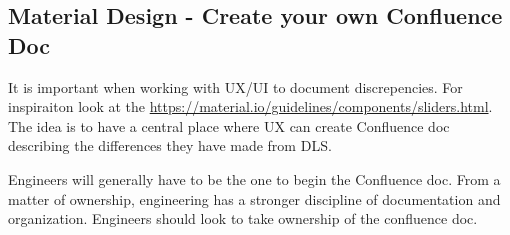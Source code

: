 \subsection{ Material Design - Create your own Confluence Doc }

It is important when working with UX/UI to document discrepencies. For
inspiraiton look at the \href{material design docs}{https://material.io/guidelines/components/sliders.html}.
The idea is to have a central place where UX can create Confluence doc
describing the differences they have made from DLS.

Engineers will generally have to be the one to begin the Confluence doc. From a
matter of ownership, engineering has a stronger discipline of documentation and
organization. Engineers should look to take ownership of the confluence doc.
